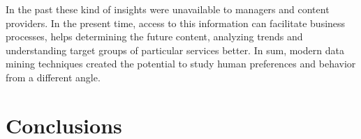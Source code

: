 \documentclass[conference]{IEEEtran}
\begin{document}
In the past these kind of insights were unavailable to managers and content providers. In the present time, access to this information can facilitate business processes, helps determining the future content, analyzing trends and understanding target groups of particular services better. In sum, modern data mining techniques created the potential to study human preferences and behavior from a different angle.

\section{Conclusions} 



\end{document}
